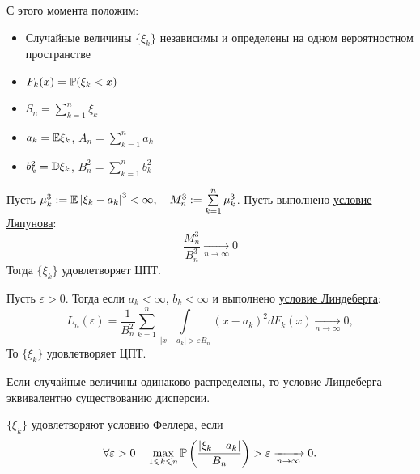 С этого момента положим:
\begin{itemize}
    \item Случайные величины $\{ \xi_k \}$ независимы и определены на одном вероятностном пространстве
    \item $F_k(x) = \mathbb{P} (\xi_k < x)$
    \item $S_n = \sum\limits_{k=1}^{n} \xi_k$
    \item $a_k = \mathbb{E} \xi_k$, $A_n = \sum\limits_{k=1}^{n} a_k$ 
    \item $b_k^2 = \mathbb{D} \xi_k$, $B_n^2 = \sum\limits_{k=1}^{n} b_k^2$
\end{itemize} 

\begin{Th}[Ляпунова]
    Пусть $\mu_k^3 := \mathbb{E} \left| \xi_k - a_k \right|^3 < \infty, \quad
    M_n^3 := \sum\limits_{k=1}^{n} \mu_k^3$. Пусть выполнено \uline{условие Ляпунова}:
    \begin{equation}\label{Lyapunov}
        \dfrac{M_n^3}{B_n^3} \xrightarrow[n \rightarrow \infty]{} 0
    \end{equation}
    Тогда $\{ \xi_k \}$ удовлетворяет ЦПТ.
\end{Th}

\begin{Th}[Линдеберга]
    Пусть $\varepsilon > 0$. Тогда если  $a_k < \infty$, $b_k < \infty$ и выполнено \uline{условие Линдеберга}:
    \begin{equation}\label{Lindeberg}
        L_n(\varepsilon) = \dfrac{1}{B_n^2} \sum\limits_{k=1}^{n} 
        \int\limits_{ \left| x - a_k \right| > \varepsilon B_n}^{}
        \left( x - a_k \right)^2 dF_k(x) \xrightarrow[n \rightarrow \infty]{}
        0,
    \end{equation} 
    То $\{ \xi_k \}$ удовлетворяет ЦПТ.
\end{Th} 

\begin{Note}
    Если случайные величины одинаково распределены, то условие Линдеберга эквивалентно существованию дисперсии.
\end{Note}

\begin{Def}
    $\{ \xi_k \} $ удовлетворяют \uline{условию Феллера}, если
    \begin{equation}\label{Feller}
        \forall \varepsilon > 0 \quad
        \max\limits_{1 \leqslant k \leqslant n}
        \mathbb{P} \left( \dfrac{ \left| \xi_k - a_k \right| }{B_n} \right) > \varepsilon
        \xrightarrow[n \rightarrow \infty]{} 0. 
    \end{equation}
\end{Def} 

